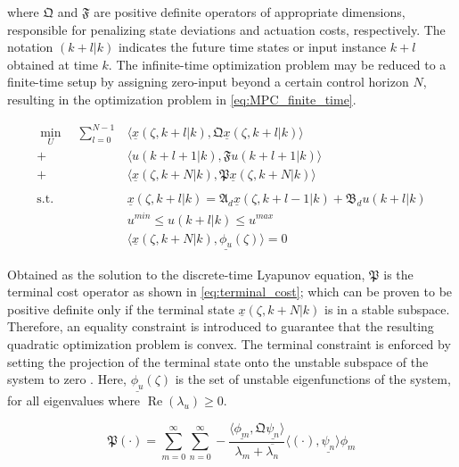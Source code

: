 where $\mathfrak{Q}$ and $\mathfrak{F}$ are positive definite operators of appropriate dimensions, responsible for penalizing state deviations and actuation costs, respectively. The notation $(k+l|k)$ indicates the future time states or input instance $k+l$ obtained at time $k$. The infinite-time optimization problem may be reduced to a finite-time setup by assigning zero-input beyond a certain control horizon $N$, resulting in the optimization problem in \eqref{eq:MPC_finite_time}.

\begin{equation} \label{eq:MPC_finite_time}
    \begin{aligned}
        \min_{U} \quad \sum_{l=0}^{N-1} &\langle \underline{x}(\zeta, k+l | k), \mathfrak{Q} \underline{x}(\zeta, k+l | k) \rangle \\
        + &\langle u(k+l+1 | k), \mathfrak{F} u(k+l+1|k) \rangle \\
        + &\langle \underline{x}(\zeta, k+N | k), \mathfrak{P} \underline{x}(\zeta, k+N | k) \rangle \\
        \, \\
        \text{s.t.} \quad &\underline{x}(\zeta, k+l | k) = \mathfrak{A}_d \underline{x}(\zeta, k+l-1 | k) + \mathfrak{B}_d u(k+l | k) \\
        &u^{min} \leq u(k+l | k) \leq u^{max} \\
        & \langle \underline{x}(\zeta, k+N | k), \underline{\phi_u}(\zeta) \rangle = 0
    \end{aligned}
\end{equation}

Obtained as the solution to the discrete-time Lyapunov equation, $\mathfrak{P}$ is the terminal cost operator as shown in \eqref{eq:terminal_cost}; which can be proven to be positive definite only if the terminal state $\underline{x}(\zeta, k+N | k)$ is in a stable subspace. Therefore, an equality constraint is introduced to guarantee that the resulting quadratic optimization problem is convex. The terminal constraint is enforced by setting the projection of the terminal state onto the unstable subspace of the system to zero \cite{curtainbook, xu2017linear,Khatibi2021Model}. Here, $\underline{\phi_u}(\zeta)$ is the set of unstable eigenfunctions of the system, for all eigenvalues where $\operatorname{Re}(\lambda_u) \geq 0$.

\begin{equation} \label{eq:terminal_cost}
    \mathfrak{P} (\cdot) = \sum_{m=0}^{\infty} \sum_{n=0}^{\infty} 
    -\frac{
        \langle \underline{\phi_m} , \mathfrak{Q} \underline{\psi_n} \rangle
    }{
        \lambda_m + \overline{\lambda_n}
    }
    \langle (\cdot) , \underline{\psi_n} \rangle \phi_m
\end{equation}

